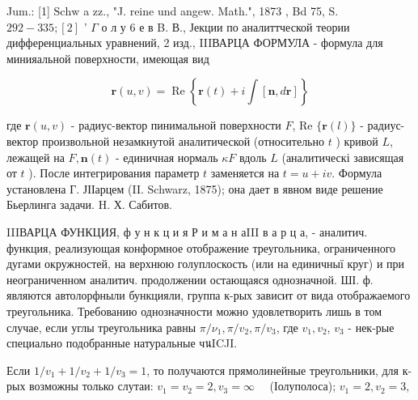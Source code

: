 \documentclass[10pt]{article}
\begin{document}
Jum.: [1] $\mathrm{S} \mathrm{ch} \mathrm{w}$ a $\mathrm{z} \mathrm{z}$., "J. reine und angew. Math.", 1873 , Bd 75, S. $292-335 ;[2]$ ' $\Gamma$ о л у 6 е в B. В., Јекции по аналиттческой теории дифференциальных уравнений, 2 изд., IIIВАРЦА ФОРМУЛА - формула для минияальной поверхности, имеющая вид



\[

\boldsymbol{r}(u, v)=\operatorname{Re}\left\{\boldsymbol{r}(t)+i \int[\boldsymbol{n}, d \boldsymbol{r}]\right\}

\]



где $\boldsymbol{r}(u, v)$ - радиус-вектор пинимальной поверхности $F$, Re $\{\boldsymbol{r}(l)\}$ - радиус-вектор произвольной незамкнутой аналитической (относительно $t$ ) кривой $L$, лежащей на $F, \boldsymbol{n}(t)$ - единичная нормаль $\kappa F$ вдоль $L$ (аналитическі зависящая от $t$ ). После интегрирования параметр $t$ заменяется на $t=u+i v$. Формула установлена Г. ЈІІарцем (II. Schwarz, 1875); она дает в явном виде решение Бьерлинга задачи. H. Х. Сабитов.



IIIВАРЦА ФУНКЦИЯ, ф у н к ц и я Р и м а н аIII в а р ц а, - аналитич. функция, реализующая конформное отображение треугольника, ограниченного дугами окружностей, на верхнюю голуплоскость (или на единичныї круг) и при неограниченном аналитич. продолжении остающаяся однозначной. ШІ. ф. являются автолорфныли бункцияли, группа к-рых зависит от вида отображаемого треугольника. Требованию однозначности можно удовлетворить лишь в том случае, если углы треугольника равны $\pi / \nu_{1}, \pi / v_{2}, \pi / v_{3}$, где $v_{1}, v_{2}$, $v_{3}$ - нек-рые специально подобранные натуральные чนICJI.



Если $1 / v_{1}+1 / v_{2}+1 / v_{3}=1$, то получаются прямолинейные треугольники, для к-рых возможны только слутаи: $v_{1}=v_{2}=2, v_{3}=\infty \quad$ (Іолуполоса); $v_{1}=2, v_{2}=3$,
\end{document}
